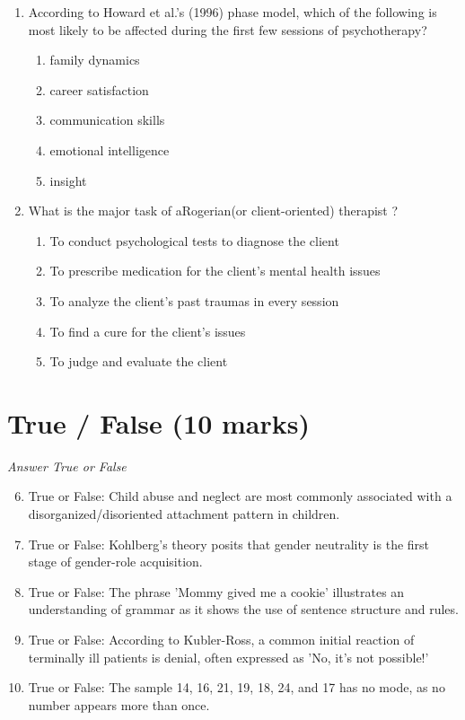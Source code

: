 \documentclass[12pt]{article}
\begin{document}
\begin{enumerate}[label=\arabic*.]
\item According to Howard et al.'s (1996) phase model, which of the following is most likely to be affected during the first few sessions of psychotherapy?
\begin{enumerate}[label=(\alph*)]
    \item family dynamics
    \item career satisfaction
    \item communication skills
    \item emotional intelligence
    \item insight
\end{enumerate}
\item What is the major task of aRogerian(or client-oriented) therapist ?
\begin{enumerate}[label=(\alph*)]
    \item To conduct psychological tests to diagnose the client
    \item To prescribe medication for the client's mental health issues
    \item To analyze the client's past traumas in every session
    \item To find a cure for the client's issues
    \item To judge and evaluate the client
\end{enumerate}
\end{enumerate}

\section*{True / False (10 marks)}
\textit{Answer True or False}
\begin{enumerate}[label=\arabic*.]
\setcounter{enumi}{5}
\item True or False: Child abuse and neglect are most commonly associated with a disorganized/disoriented attachment pattern in children.
\item True or False: Kohlberg's theory posits that gender neutrality is the first stage of gender-role acquisition.
\item True or False: The phrase 'Mommy gived me a cookie' illustrates an understanding of grammar as it shows the use of sentence structure and rules.
\item True or False: According to Kubler-Ross, a common initial reaction of terminally ill patients is denial, often expressed as 'No, it's not possible!'
\item True or False: The sample 14, 16, 21, 19, 18, 24, and 17 has no mode, as no number appears more than once.
\end{enumerate}
\end{document}
